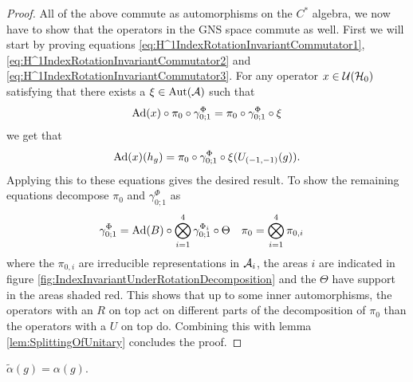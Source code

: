 \documentclass[11pt,a4paper,twoside]{article}
\numberwithin{equation}{section}
\begin{document}
	\begin{proof}
		All of the above commute as automorphisms on the $C^*$ algebra, we now have to show that the operators in the GNS space commute as well. First we will start by proving equations \eqref{eq:H^1IndexRotationInvariantCommutator1}, \eqref{eq:H^1IndexRotationInvariantCommutator2} and \eqref{eq:H^1IndexRotationInvariantCommutator3}. For any operator $x\in\UU(\HH_0)$ satisfying that there exists a $\xi\in\Aut{\AA}$ such that
		\begin{equation}
			\Ad{x}\circ\pi_0\circ\gamma^{\Phi}_{0;1}=\pi_0\circ\gamma^{\Phi}_{0;1}\circ\xi
		\end{equation}
		we get that
		\begin{equation}
			\Ad{x}(h_g)=\pi_0\circ\gamma^\Phi_{0;1}\circ\xi(U_{(-1,-1)}(g)).
		\end{equation}
		Applying this to these equations gives the desired result. To show the remaining equations decompose $\pi_0$ and $\gamma^\Phi_{0;1}$ as
		\begin{align}
			\gamma^\Phi_{0;1}&=\Ad{B}\circ\bigotimes_{i=1}^4\gamma^{\Phi_i}_{0;1}\circ\Theta&\pi_0&=\bigotimes_{i=1}^4\pi_{0,i}
		\end{align}
		where the $\pi_{0,i}$ are irreducible representations in $\AA_i$, the areas $i$ are indicated in figure \ref{fig:IndexInvariantUnderRotationDecomposition} and the $\Theta$ have support in the areas shaded red. This shows that up to some inner automorphisms, the operators with an $R$ on top act on different parts of the decomposition of $\pi_0$ than the operators with a $U$ on top do. Combining this with lemma \ref{lem:SplittingOfUnitary} concludes the proof.
	\end{proof}
	\begin{lemma}
		$\tilde{\alpha}(g)=\alpha(g)$.
	\end{lemma}
\end{document}
